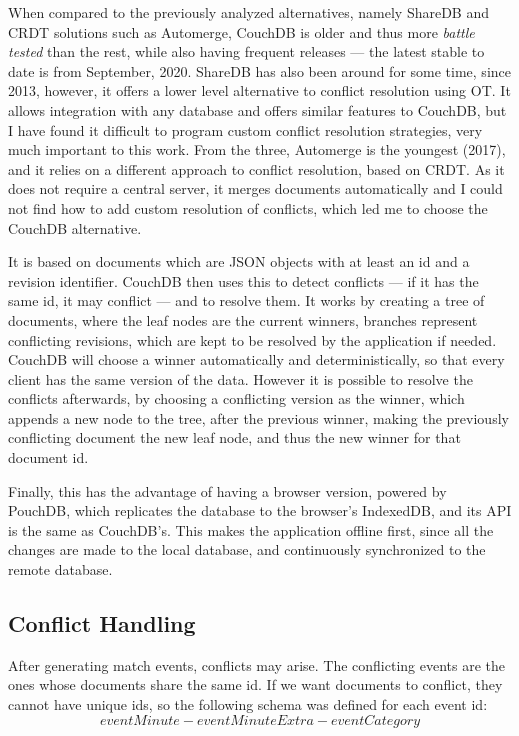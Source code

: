 When compared to the previously analyzed alternatives, namely ShareDB and CRDT solutions such as Automerge, CouchDB is older and thus more \textit{battle tested} than the rest, while also having frequent releases --- the latest stable to date is from September, 2020. ShareDB has also been around for some time, since 2013, however, it offers a lower level alternative to conflict resolution using OT. It allows integration with any database and offers similar features to CouchDB, but I have found it difficult to program custom conflict resolution strategies, very much important to this work. From the three, Automerge is the youngest (2017), and it relies on a different approach to conflict resolution, based on CRDT. As it does not require a central server, it merges documents automatically and I could not find how to add custom resolution of conflicts, which led me to choose the CouchDB alternative.

It is based on documents which are JSON objects with at least an id and a revision identifier. CouchDB then uses this to detect conflicts --- if it has the same id, it may conflict --- and to resolve them. It works by creating a tree of documents, where the leaf nodes are the current winners, branches represent conflicting revisions, which are kept to be resolved by the application if needed. CouchDB will choose a winner automatically and deterministically, so that every client has the same version of the data. However it is possible to resolve the conflicts afterwards, by choosing a conflicting version as the winner, which appends a new node to the tree, after the previous winner, making the previously conflicting document the new leaf node, and thus the new winner for that document id.

Finally, this has the advantage of having a browser version, powered by PouchDB, which replicates the database to the browser's IndexedDB, and its API is the same as CouchDB's. This makes the application offline first, since all the changes are made to the local database, and continuously synchronized to the remote database.

\subsection{Conflict Handling}

After generating match events, conflicts may arise. The conflicting events are the ones whose documents share the same id. If we want documents to conflict, they cannot have unique ids, so the following schema was defined for each event id:
\begin{equation}
    eventMinute-eventMinuteExtra-eventCategory
\end{equation}

